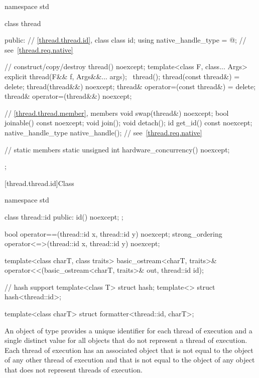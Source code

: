 %
\begin{codeblock}
namespace std {
  class thread {
  public:
    // \ref{thread.thread.id}, class 
    class id;
    using native_handle_type = @\impdefnc@;         // see~\ref{thread.req.native}

    // construct/copy/destroy
    thread() noexcept;
    template<class F, class... Args> explicit thread(F&& f, Args&&... args);
    ~thread();
    thread(const thread&) = delete;
    thread(thread&&) noexcept;
    thread& operator=(const thread&) = delete;
    thread& operator=(thread&&) noexcept;

    // \ref{thread.thread.member}, members
    void swap(thread&) noexcept;
    bool joinable() const noexcept;
    void join();
    void detach();
    id get_id() const noexcept;
    native_handle_type native_handle();                         // see~\ref{thread.req.native}

    // static members
    static unsigned int hardware_concurrency() noexcept;
  };
}
\end{codeblock}

[thread.thread.id]{Class }

%
%
\begin{codeblock}
namespace std {
  class thread::id {
  public:
    id() noexcept;
  };

  bool operator==(thread::id x, thread::id y) noexcept;
  strong_ordering operator<=>(thread::id x, thread::id y) noexcept;

  template<class charT, class traits>
    basic_ostream<charT, traits>&
      operator<<(basic_ostream<charT, traits>& out, thread::id id);

  // hash support
  template<class T> struct hash;
  template<> struct hash<thread::id>;

  template<class charT>
  struct formatter<thread::id, charT>;
}
\end{codeblock}

\pnum
An object of type  provides a unique identifier for
each thread of execution and a single distinct value for all 
objects that do not represent a thread of
execution. Each thread of execution has an
associated  object that is not equal to the
 object of any other thread of execution and that is not
equal to the  object of any  object that
does not represent threads of execution.

